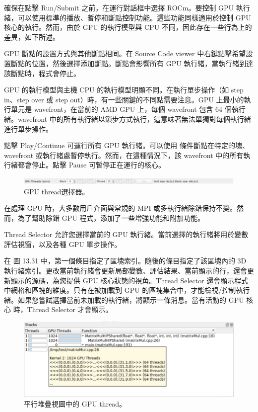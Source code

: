 確保在點擊 Run/Submit 之前，在運行對話框中選擇 ROCm。要控制 GPU 執行緒，可以使用標準的播放、暫停和斷點控制功能。這些功能同樣適用於控制 GPU 核心的執行。然而，由於 GPU 的執行模型與 CPU 不同，因此存在一些行為上的差異，如下所述。

GPU 斷點的設置方式與其他斷點相同。在 Source Code viewer 中右鍵點擊希望設置斷點的位置，然後選擇添加斷點。斷點會影響所有 GPU 執行緒，當執行緒到達該斷點時，程式會停止。

GPU 的執行模型與主機 CPU 的執行模型明顯不同。在執行單步操作（如 step in、step over 或 step out）時，有一些關鍵的不同點需要注意。GPU 上最小的執行單元是 wavefront，在當前的 AMD GPU 上，每個 wavefront 包含 64 個執行緒。wavefront 中的所有執行緒以鎖步方式執行，這意味著無法單獨對每個執行緒進行單步操作。

點擊 Play/Continue 可運行所有 GPU 執行緒。可以使用 條件斷點在特定的塊、wavefront 或執行緒處暫停執行。然而，在這種情況下，該 wavefront 中的所有執行緒都會停止。點擊 Pause 可暫停正在運行的核心。

\begin{figure}
    \centering
    \includegraphics[width=0.9\linewidth]{FileAusiliari/Screenshots/Figure13-31.png}
    \caption{GPU thread選擇器。}
    \label{fig:PAPI31}
\end{figure}

在處理 GPU 時，大多數用戶介面與常規的 MPI 或多執行緒除錯保持不變。然而，為了幫助除錯 GPU 程式，添加了一些增強功能和附加功能。

Thread Selector 允許您選擇當前的 GPU 執行緒。當前選擇的執行緒將用於變數評估視窗，以及各種 GPU 單步操作。

在 圖 13.31 中，第一個條目指定了區塊索引。隨後的條目指定了該區塊內的 3D 執行緒索引。更改當前執行緒會更新局部變數、評估結果、當前顯示的行，還會更新顯示的源碼，為您提供 GPU 核心狀態的視角。Thread Selector 還會顯示程式中網格和區塊的維度。只有在被加載到 GPU 的區塊集合中，才能檢視/控制執行緒。如果您嘗試選擇當前未加載的執行緒，將顯示一條消息。當有活動的 GPU 核心 時，Thread Selector 才會顯示。

\begin{figure}
    \centering
    \includegraphics[width=0.9\linewidth]{FileAusiliari/Screenshots/Figure13-32.png}
    \caption{平行堆疊視圖中的 GPU thread。}
    \label{fig:PAPI32}
\end{figure}

